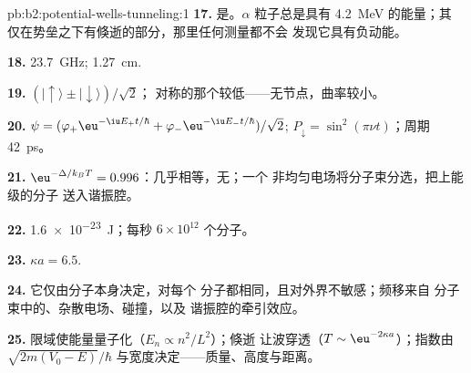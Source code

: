 \begin{solution}{pb:b2:potential-wells-tunneling:1}
\textbf{17.} 是。$\alpha$ 粒子总是具有 \qty{4.2}{MeV} 的能量；其
仅在势垒之下有倏逝的部分，那里任何测量都不会
发现它具有负动能。

\textbf{18.} \qty{23.7}{GHz}; \qty{1.27}{cm}.

\textbf{19.} $(|{\uparrow}\rangle \pm |{\downarrow}\rangle)/\sqrt2$；
对称的那个较低——无节点，曲率较小。

\textbf{20.} $\psi = (\varphi_+\eu^{-\iu E_+t/\hbar} + \varphi_-\eu^{-\iu E_-t/\hbar})/\sqrt2$;
$P_{\downarrow} = \sin^2(\pi\nu t)$；周期 \qty{42}{ps}。

\textbf{21.} $\eu^{-\Delta/k_BT} = 0.996$：几乎相等，无；一个
非均匀电场将分子束分选，把上能级的分子
送入谐振腔。

\textbf{22.} \qty{1.6e-23}{J}；每秒 $6 \times 10^{12}$ 个分子。

\textbf{23.} $\kappa a = 6.5$.

\textbf{24.} 它仅由分子本身决定，对每个
分子都相同，且对外界不敏感；频移来自
分子束中的、杂散电场、碰撞，以及
谐振腔的牵引效应。

\textbf{25.} 限域使能量量子化（$E_n \propto n^2/L^2$）；倏逝
让波穿透（$T \sim \eu^{-2\kappa a}$）；指数由
$\sqrt{2m(V_0 - E)}/\hbar$ 与宽度决定——质量、高度与距离。
\end{solution}
